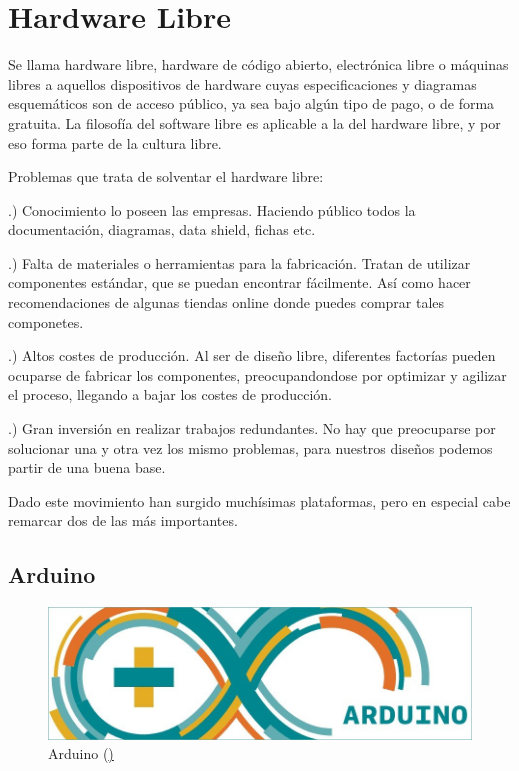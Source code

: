 \bigskip

\newpage

\section{Hardware Libre}


Se llama hardware libre, hardware de código abierto, electrónica libre o máquinas libres a aquellos dispositivos de hardware cuyas especificaciones y diagramas esquemáticos son de acceso público, ya sea bajo algún tipo de pago, o de forma gratuita. La filosofía del software libre es aplicable a la del hardware libre, y por eso forma parte de la cultura libre. \cite{HWLIBRE}

Problemas que trata de solventar el hardware libre:

.) Conocimiento lo poseen las empresas.
	Haciendo público todos la documentación, diagramas, data shield, fichas etc.

.) Falta de materiales o herramientas para la fabricación.
	Tratan de utilizar componentes estándar, que se puedan encontrar fácilmente. 
	Así como hacer recomendaciones de algunas tiendas online donde puedes comprar tales componetes.  

.) Altos costes de producción.
	Al ser de diseño libre, diferentes factorías pueden ocuparse de fabricar los componentes, preocupandondose por optimizar y agilizar el proceso, llegando a bajar los costes de producción.

 .) Gran inversión en realizar trabajos redundantes. 
	No hay que preocuparse por solucionar una y otra vez los mismo problemas, para nuestros diseños podemos partir de una buena base.


Dado este movimiento han surgido muchísimas plataformas, pero en especial cabe remarcar dos de las más importantes. 

\newpage
\subsection{Arduino}


\begin{figure}
\centering
\includegraphics[width=0.5\linewidth]{../images/arduino}
\caption[Arduino]{Arduino (\href{https://www.arduino.cc/})}
\label{fig:arduino}
\end{figure}


